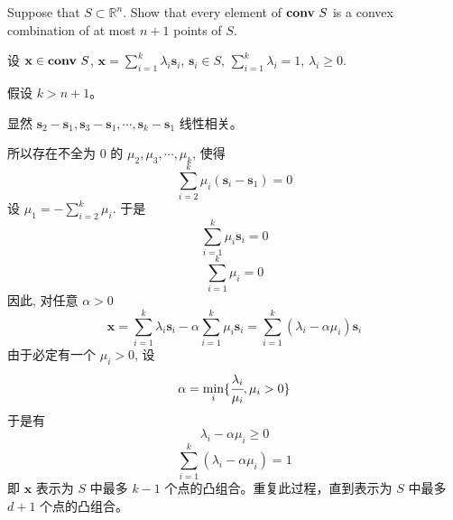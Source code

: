 \documentclass[11pt,letter,notitlepage]{article}
\theoremstyle{definition}
\DeclareMathOperator*{\conv}{\bf conv\,}
\begin{document}
\newpage

\begin{exercise}
	Suppose that $S \subset \mathbb{R}^n$. Show that every element of $\conv S$ is a convex combination of at most $n + 1$ points of $S$.
\end{exercise}
\begin{solution}
	设 $\mathbf{x}\in \conv S$, $\mathbf{x}=\sum_{i=1}^k \lambda_i \mathbf{s}_i$, $\mathbf{s}_i\in S$, $\sum_{i=1}^k \lambda_i=1$, $\lambda_i\geq0$.

	假设 $k>n+1$。

	显然 $\mathbf{s}_2-\mathbf{s}_1, \mathbf{s}_3-\mathbf{s}_1, \cdots, \mathbf{s}_k-\mathbf{s}_1$ 线性相关。

	所以存在不全为 $0$ 的 $\mu_2,\mu_3,\cdots,\mu_k$, 使得
	$$\sum_{i=2}^k \mu_i (\mathbf{s}_i-\mathbf{s}_1)=0$$
	设 $\mu_1=-\sum_{i=2}^k \mu_i$. 于是
	$$\sum_{i=1}^k \mu_i \mathbf{s}_i=0$$
	$$\sum_{i=1}^k \mu_i=0$$
	因此, 对任意 $\alpha >0$
	$$\mathbf{x}=\sum_{i=1}^k \lambda_i \mathbf{s}_i-\alpha \sum_{i=1}^k \mu_i \mathbf{s}_i=\sum_{i=1}^k (\lambda_i-\alpha\mu_i)\mathbf{s}_i$$
	由于必定有一个 $\mu_i>0$, 设
	$$\alpha=\min_i \{\cfrac{\lambda_i}{\mu_i}, \mu_i>0\}$$
	于是有
	$$\lambda_i-\alpha\mu_i\geq 0$$
	$$\sum_{i=1}^k (\lambda_i-\alpha\mu_i)=1$$
	即 $\mathbf{x}$ 表示为 $S$ 中最多 $k-1$ 个点的凸组合。重复此过程，直到表示为 $S$ 中最多 $d+1$ 个点的凸组合。
\end{solution}

\newpage
\end{document}
